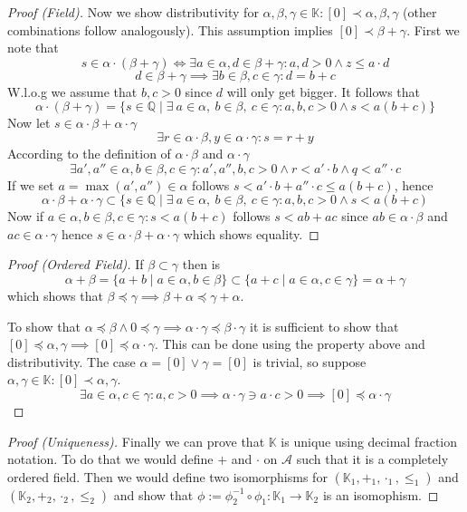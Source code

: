 \documentclass[english,titlepage]{uzhpub}
\theoremstyle{definition}
\theoremstyle{plain}
\theoremstyle{remark}
\theoremstyle{example}
\begin{document}
\begin{proof}[Proof (Field)]
      Now we show distributivity for \(\alpha, \beta, \gamma \in \mathbb{K}: [0] \prec \alpha, \beta, \gamma\) (other combinations follow analogously).
      This assumption implies \([0] \prec \beta + \gamma\).
      First we note that
      \[s \in \alpha \cdot (\beta + \gamma) \iff \exists a \in \alpha, d \in \beta + \gamma: a, d > 0 \land z \leq a \cdot d\]
      \[d \in \beta + \gamma \implies \exists b \in \beta, c \in \gamma: d = b + c\]
      W.l.o.g we assume that \(b, c > 0\) since \(d\) will only get bigger.
      It follows that
      \[\alpha \cdot (\beta + \gamma) = \{s \in \mathbb{Q} \mid \exists~a \in \alpha,~b \in \beta,~c \in \gamma: a, b, c > 0 \land s < a(b + c)\}\]
      Now let \(s \in \alpha \cdot \beta + \alpha \cdot \gamma\)
      \[\exists r \in \alpha \cdot \beta, y \in \alpha \cdot \gamma: s = r + y\]
      According to the definition of \(\alpha \cdot \beta\) and \(\alpha \cdot \gamma\)
      \[\exists a', a'' \in \alpha, b \in \beta, c \in \gamma: a', a'', b, c > 0 \land r < a' \cdot b \land q < a'' \cdot c\]
      If we set \(a = \max(a', a'') \in \alpha\) follows \(s < a' \cdot b + a'' \cdot c \leq a(b + c)\), hence
      \[\alpha \cdot \beta + \alpha \cdot \gamma \subset \{s \in \mathbb{Q} \mid \exists~a \in \alpha,~b \in \beta,~c \in \gamma: a, b, c > 0 \land s < a(b + c)\]
         Now if \(a \in \alpha, b \in \beta, c \in \gamma: s < a(b + c)\) follows \(s < ab + ac\) since \(ab \in \alpha \cdot \beta\) and \(ac \in \alpha \cdot \gamma\) hence \(s \in \alpha \cdot \beta + \alpha \cdot \gamma\) which shows equality.
   \end{proof}
   \begin{proof}[Proof (Ordered Field)]
      If \(\beta \subset \gamma\) then is
      \[\alpha + \beta = \{a + b \mid a \in \alpha, b \in \beta\} \subset \{a + c \mid a \in \alpha, c \in \gamma\} = \alpha + \gamma\]
      which shows that \(\beta \preceq \gamma \implies \beta + \alpha \preceq \gamma + \alpha\).

      To show that \(\alpha \preceq \beta \land 0 \preceq \gamma \implies \alpha \cdot \gamma \preceq \beta \cdot \gamma\) it is sufficient to show that \([0] \preceq \alpha, \gamma \implies [0] \preceq \alpha \cdot \gamma\).
      This can be done using the property above and distributivity.
      The case \(\alpha = [0] \lor \gamma = [0]\) is trivial, so suppose \(\alpha, \gamma \in \mathbb{K}: [0] \prec \alpha, \gamma\).
      \[\exists a \in \alpha, c \in \gamma: a, c > 0 \implies \alpha \cdot \gamma \ni a \cdot c > 0 \implies [0] \preceq \alpha \cdot \gamma\]
   \end{proof}
   \begin{proof}[Proof (Uniqueness)]
      Finally we can prove that \(\mathbb{K}\) is unique using decimal fraction notation.
      To do that we would define \(+\) and \(\cdot\) on \(\mathcal{A}\) such that it is a completely ordered field.
      Then we would define two isomorphisms for \((\mathbb{K}_1, +_1, \cdot_1, \leq_1)\) and  \((\mathbb{K}_2, +_2, \cdot_2, \leq_2)\)
      and show that \(\phi := \phi_2^{-1} \circ \phi_1: \mathbb{K}_1 \to \mathbb{K}_2\) is an isomophism.
   \end{proof}
\end{document}
